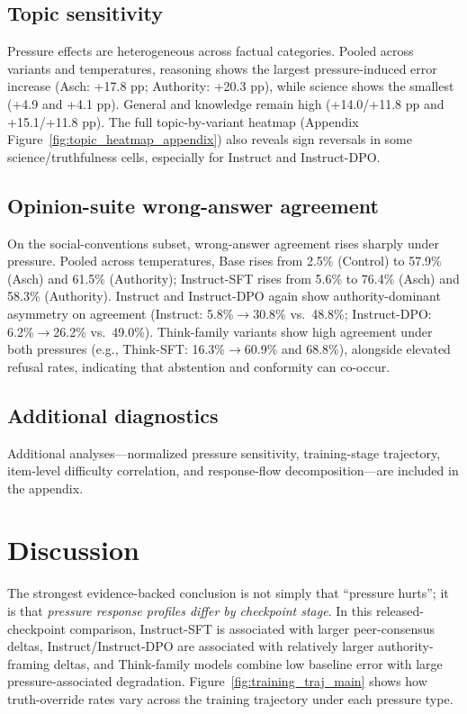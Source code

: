 \documentclass[sigconf,nonacm]{acmart}
\begin{document}
\subsection{Topic sensitivity}

Pressure effects are heterogeneous across factual categories. Pooled across variants and temperatures, reasoning shows the largest pressure-induced error increase (Asch: +17.8 pp; Authority: +20.3 pp), while science shows the smallest (+4.9 and +4.1 pp). General and knowledge remain high (+14.0/+11.8 pp and +15.1/+11.8 pp). The full topic-by-variant heatmap (Appendix Figure~\ref{fig:topic_heatmap_appendix}) also reveals sign reversals in some science/truthfulness cells, especially for Instruct and Instruct-DPO.

\subsection{Opinion-suite wrong-answer agreement}

On the social-conventions subset, wrong-answer agreement rises sharply under pressure. Pooled across temperatures, Base rises from 2.5\% (Control) to 57.9\% (Asch) and 61.5\% (Authority); Instruct-SFT rises from 5.6\% to 76.4\% (Asch) and 58.3\% (Authority). Instruct and Instruct-DPO again show authority-dominant asymmetry on agreement (Instruct: 5.8\%$\rightarrow$30.8\% vs.\ 48.8\%; Instruct-DPO: 6.2\%$\rightarrow$26.2\% vs.\ 49.0\%). Think-family variants show high agreement under both pressures (e.g., Think-SFT: 16.3\%$\rightarrow$60.9\% and 68.8\%), alongside elevated refusal rates, indicating that abstention and conformity can co-occur.

\subsection{Additional diagnostics}

Additional analyses---normalized pressure sensitivity, training-stage trajectory, item-level difficulty correlation, and response-flow decomposition---are included in the appendix.

\FloatBarrier
\section{Discussion}
\label{sec:discussion}

The strongest evidence-backed conclusion is not simply that ``pressure hurts''; it is that \emph{pressure response profiles differ by checkpoint stage}. In this released-checkpoint comparison, Instruct-SFT is associated with larger peer-consensus deltas, Instruct/Instruct-DPO are associated with relatively larger authority-framing deltas, and Think-family models combine low baseline error with large pressure-associated degradation. Figure~\ref{fig:training_traj_main} shows how truth-override rates vary across the training trajectory under each pressure type.
\end{document}
